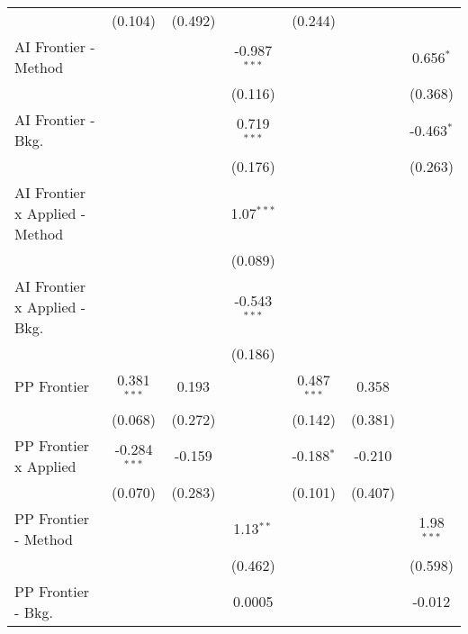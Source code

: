 \begin{tabular}{lcccccc}
                                  & (0.104)        & (0.492)       &                & (0.244)       &         &   \\   
   AI Frontier - Method           &                &               & -0.987$^{***}$ &               &         & 0.656$^{*}$\\   
                                  &                &               & (0.116)        &               &         & (0.368)\\   
   AI Frontier - Bkg.             &                &               & 0.719$^{***}$  &               &         & -0.463$^{*}$\\   
                                  &                &               & (0.176)        &               &         & (0.263)\\   
   AI Frontier x Applied - Method &                &               & 1.07$^{***}$   &               &         &   \\   
                                  &                &               & (0.089)        &               &         &   \\   
   AI Frontier x Applied - Bkg.   &                &               & -0.543$^{***}$ &               &         &   \\   
                                  &                &               & (0.186)        &               &         &   \\   
   PP Frontier                    & 0.381$^{***}$  & 0.193         &                & 0.487$^{***}$ & 0.358   &   \\   
                                  & (0.068)        & (0.272)       &                & (0.142)       & (0.381) &   \\   
   PP Frontier x Applied          & -0.284$^{***}$ & -0.159        &                & -0.188$^{*}$  & -0.210  &   \\   
                                  & (0.070)        & (0.283)       &                & (0.101)       & (0.407) &   \\   
   PP Frontier - Method           &                &               & 1.13$^{**}$    &               &         & 1.98$^{***}$\\   
                                  &                &               & (0.462)        &               &         & (0.598)\\   
   PP Frontier - Bkg.             &                &               & 0.0005         &               &         & -0.012\\   

\end{tabular}

